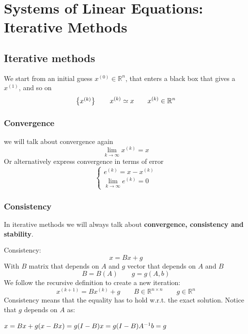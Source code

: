 
\section{Systems of Linear Equations: Iterative Methods}

\subsection{Iterative methods}
    We start from an initial guess $x^{(0)}\in\mathbb{R}^n$, that enters a black box that gives a $x^{(1)}$, and so on
    $$
    \begin{Bmatrix} {x^{(k)}} \end{Bmatrix}\qquad x^{(k)}\simeq x\qquad x^{(k)}\in\mathbb{R}^n
    $$

    \subsubsection{Convergence}
    we will talk about convergence again
    $$
    \lim_{k\rightarrow\infty}x^{(k)}=x
    $$
    Or alternatively express convergence in terms of error
    $$
    \begin{cases}
        e^{(k)}=x-x^{(k)}\\
        \lim_{k\rightarrow\infty}e^{(k)}=0
    \end{cases}
    $$
    \subsubsection{Consistency}
    In iterative methods we will always talk about \textbf{convergence, consistency and stability}.

    Consistency:
    $$
    x=Bx+g
    $$
    With $B$ matrix that depends on $A$ and $g$ vector that depends on $A$ and $B$
    $$
    B=B(A)\qquad g=g(A,b)
    $$
    We follow the recursive definition to create a new iteration:
    $$
    x^{(k+1)}=Bx^{(k)}+g\qquad B\in\mathbb{R}^{n\times n}\qquad g\in\mathbb{R}^n
    $$
    Consistency means that the equality has to hold w.r.t. the exact solution. Notice that $g$ depends on $A$ as:

    $
    x=Bx+g\\
    (x-Bx)=g\\
    (I-B)x=g\\
    (I-B)A^{-1}b=g
    $

